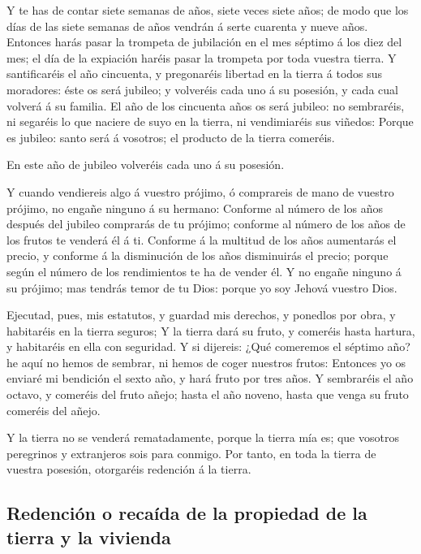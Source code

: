  Y te has de contar siete semanas de años, siete veces siete
años; de modo que los días de las siete semanas de años vendrán á serte
cuarenta y nueve años.  Entonces harás pasar la trompeta de
jubilación en el mes séptimo á los diez del mes; el día de la expiación
haréis pasar la trompeta por toda vuestra tierra.  Y
santificaréis el año cincuenta, y pregonaréis libertad en la tierra á
todos sus moradores: éste os será jubileo; y volveréis cada uno á su
posesión, y cada cual volverá á su familia.  El año de los
cincuenta años os será jubileo: no sembraréis, ni segaréis lo que
naciere de suyo en la tierra, ni vendimiaréis sus viñedos: 
Porque es jubileo: santo será á vosotros; el producto de la tierra
comeréis.

 En este año de jubileo volveréis cada uno á su posesión.

 Y cuando vendiereis algo á vuestro prójimo, ó comprareis
de mano de vuestro prójimo, no engañe ninguno á su hermano:
 Conforme al número de los años después del jubileo
comprarás de tu prójimo; conforme al número de los años de los frutos te
venderá él á ti.  Conforme á la multitud de los años
aumentarás el precio, y conforme á la disminución de los años
disminuirás el precio; porque según el número de los rendimientos te ha
de vender él.  Y no engañe ninguno á su prójimo; mas
tendrás temor de tu Dios: porque yo soy Jehová vuestro Dios.

 Ejecutad, pues, mis estatutos, y guardad mis derechos, y
ponedlos por obra, y habitaréis en la tierra seguros;  Y la
tierra dará su fruto, y comeréis hasta hartura, y habitaréis en ella con
seguridad.  Y si dijereis: ¿Qué comeremos el séptimo año?
he aquí no hemos de sembrar, ni hemos de coger nuestros frutos:
 Entonces yo os enviaré mi bendición el sexto año, y hará
fruto por tres años.  Y sembraréis el año octavo, y
comeréis del fruto añejo; hasta el año noveno, hasta que venga su fruto
comeréis del añejo.

 Y la tierra no se venderá rematadamente, porque la tierra
mía es; que vosotros peregrinos y extranjeros sois para conmigo.
 Por tanto, en toda la tierra de vuestra posesión,
otorgaréis redención á la tierra.

\hypertarget{redenciuxf3n-o-recauxedda-de-la-propiedad-de-la-tierra-y-la-vivienda}{%
\subsection{Redención o recaída de la propiedad de la tierra y la
vivienda}\label{redenciuxf3n-o-recauxedda-de-la-propiedad-de-la-tierra-y-la-vivienda}}

